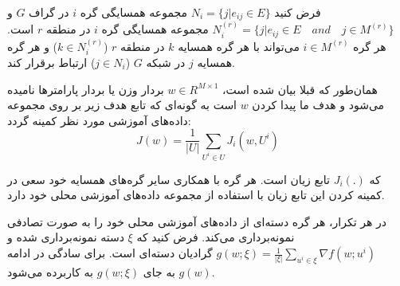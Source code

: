 	فرض کنید $N_i=\{j|e_{ij}\in E\}$ مجموعه همسایگی گره $i$ در گراف $G$ و $N_i^{(r)}=\{j| e_{ij}\in E\quad and\quad j\in M^{(r)}\}$ مجموعه همسایگی گره $i$ در منطقه $r$ است. هر گره $i\in M^{(r)}$ می‌تواند با هر گره‌ همسایه $ k$ در منطقه $r$ ($k\in N_i^{(r)}$) و هر گره همسایه $j$ در شبکه $G$ ($j\in N_i$) ارتباط برقرار کند. 
  
	
	همان‌طور که قبلا بیان شده است، $w\in R^{M\times 1}$ بردار وزن یا بردار پارامترها نامیده می‌شود و هدف ما پیدا کردن $w$ است به گونه‌ای که تابع هدف زیر بر روی مجموعه داده‌های آموزشی مورد نظر کمینه گردد:
\begin{equation}
	J(w)=\frac{1}{|U|}\sum_{U^i\in U} J_i(w,U^i)
\end{equation}
	
که $J_i(.)$ تابع زیان است. هر گره‌ با همکاری سایر گره‌های همسایه خود سعی در کمینه کردن این تابع زیان با استفاده از مجموعه داده‌های آموزشی محلی خود دارد. 
	
	در هر تکرار، هر گره دسته‌ای از داده‌های آموزشی محلی خود را به صورت تصادفی نمونه‌برداری می‌کند. فرض کنید که $\xi$ دسته نمونه‌برداری شده و $g(w;\xi)=\frac{1}{|\xi|}\sum_{u^i\in \xi} \nabla f(w;u^i)$ گرادیان دسته‌ای است. برای سادگی در ادامه $g(w)$ به جای $g(w;\xi)$ به کاربرده می‌شود.
	

